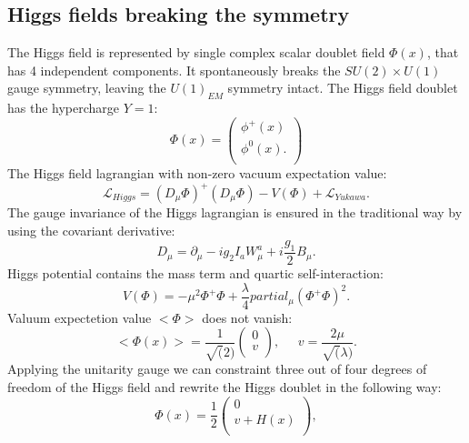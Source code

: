 \subsection{Higgs fields breaking the symmetry}
The Higgs field is represented by single complex scalar doublet field $\Phi(x)$, that has 4 independent components. It spontaneously breaks the  $SU(2)\times U(1)$ gauge symmetry, leaving the $U(1)_{EM}$ symmetry intact. The Higgs field doublet has the hypercharge $Y=1$:
  \begin{equation}
\Phi(x) = \begin{pmatrix}
\phi^{+}(x)  \\
\phi^{0}(x).  \\
\end{pmatrix}
\end{equation}
The Higgs field lagrangian with non-zero vacuum expectation value: 
 \begin{equation}
\mathcal{L}_{Higgs} = (D_{\mu}\Phi)^+(D_{\mu}\Phi)-V(\Phi)+\mathcal{L}_{Yukawa}.
\end{equation}
The gauge invariance of the Higgs lagrangian is ensured in the traditional way by using the covariant derivative:
 \begin{equation}
D_{\mu} = \partial_{\mu} - ig_2I_aW^a_{\mu}+i\frac{g_1}{2}B_{\mu}.
\end{equation}
Higgs potential contains the mass term and quartic self-interaction:
 \begin{equation}
V(\Phi) = -\mu^2 \Phi^+\Phi + \frac{\lambda}{4}partial_{\mu}(\Phi^+\Phi)^2.
\end{equation}
Valuum expectetion value $<\Phi>$ does not vanish:
  \begin{equation}
<\Phi(x)> = \frac{1}{\sqrt(2)}\begin{pmatrix}
0  \\
v \\
\end{pmatrix},\;\;\;\;\; 
v = \frac{2\mu}{\sqrt(\lambda)}.
\end{equation}
Applying the unitarity gauge \cite{weinberg2} we can constraint three out of four degrees of freedom of the Higgs field and rewrite the Higgs doublet in the following way:
  \begin{equation}
 \Phi(x) = \frac{1}{2}\begin{pmatrix}
 	0 \\
 	v+H(x)  \\
 \end{pmatrix},
  \end{equation}
